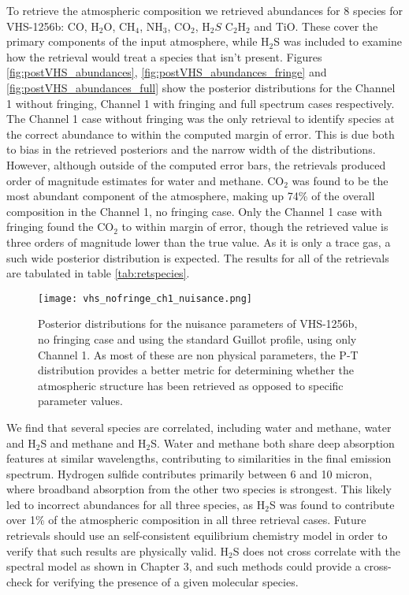 To retrieve the atmospheric composition we retrieved abundances for 8 species for VHS-1256b: CO, H$_{2}$O, CH$_{4}$, NH$_{3}$, CO$_{2}$, H$_{2}S$ C$_{2}$H$_{2}$ and TiO.
These cover the primary components of the input atmosphere, while H$_{2}$S was included to examine how the retrieval would treat a species that isn't present.
Figures \ref{fig:postVHS_abundances}, \ref{fig:postVHS_abundances_fringe} and \ref{fig:postVHS_abundances_full} show the posterior distributions for the Channel 1 without fringing, Channel 1 with fringing and full spectrum cases respectively. 
The Channel 1 case without fringing was the only retrieval to identify species at the correct abundance to within the computed margin of error.
This is due both to bias in the retrieved posteriors and the narrow width of the distributions.
However, although outside of the computed error bars, the retrievals produced order of magnitude estimates for water and methane. 
CO$_{2}$ was found to be the most abundant component of the atmosphere, making up 74\% of the overall composition in the Channel 1, no fringing case.
Only the Channel 1 case with fringing found the CO$_{2}$ to within margin of error, though the retrieved value is three orders of magnitude lower than the true value.
As it is only a trace gas, a such wide posterior distribution is expected.
The results for all of the retrievals are tabulated in table \ref{tab:retspecies}. 

\begin{figure}[t]
	\centering
	\texttt{[image: vhs\_nofringe\_ch1\_nuisance.png]}
	\caption{Posterior distributions for the nuisance parameters of VHS-1256b, no fringing case and using the standard Guillot profile, using only Channel 1. As most of these are non physical parameters, the P-T distribution provides a better metric for determining whether the atmospheric structure has been retrieved as opposed to specific parameter values.}
	\label{fig:postVHS_nuisance}
\end{figure}

We find that several species are correlated, including water and methane, water and H$_{2}$S and methane and H$_{2}$S.
Water and methane both share deep absorption features at similar wavelengths, contributing to similarities in the final emission spectrum.
Hydrogen sulfide contributes primarily between 6 and 10 micron, where broadband absorption from the other two species is strongest.
This likely led to incorrect abundances for all three species, as H$_{2}$S was found to contribute over 1\% of the atmospheric composition in all three retrieval cases.
Future retrievals should use an self-consistent equilibrium chemistry model in order to verify that such results are physically valid. 
H$_{2}$S does not cross correlate with the spectral model as shown in Chapter 3, and such methods could provide a cross-check for verifying the presence of a given molecular species.

